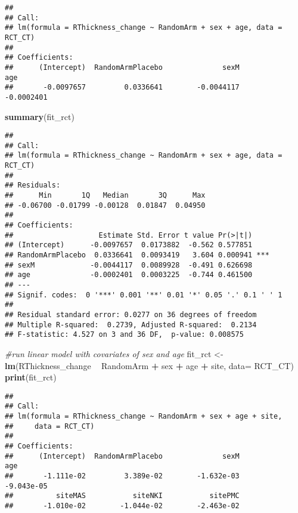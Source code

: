 \documentclass[]{article}
\newenvironment{Shaded}{\begin{snugshade}}{\end{snugshade}}
\newcommand{\KeywordTok}[1]{\textcolor[rgb]{0.13,0.29,0.53}{\textbf{#1}}}
\newcommand{\DataTypeTok}[1]{\textcolor[rgb]{0.13,0.29,0.53}{#1}}
\newcommand{\StringTok}[1]{\textcolor[rgb]{0.31,0.60,0.02}{#1}}
\newcommand{\CommentTok}[1]{\textcolor[rgb]{0.56,0.35,0.01}{\textit{#1}}}
\newcommand{\OperatorTok}[1]{\textcolor[rgb]{0.81,0.36,0.00}{\textbf{#1}}}
\newcommand{\NormalTok}[1]{#1}
\theoremstyle{definition}
\theoremstyle{definition}
\theoremstyle{definition}
\theoremstyle{remark}
\begin{document}
\begin{verbatim}
## 
## Call:
## lm(formula = RThickness_change ~ RandomArm + sex + age, data = RCT_CT)
## 
## Coefficients:
##      (Intercept)  RandomArmPlacebo              sexM               age  
##       -0.0097657         0.0336641        -0.0044117        -0.0002401
\end{verbatim}

\begin{Shaded}
\begin{Highlighting}[]
  \KeywordTok{summary}\NormalTok{(fit_rct)}
\end{Highlighting}
\end{Shaded}

\begin{verbatim}
## 
## Call:
## lm(formula = RThickness_change ~ RandomArm + sex + age, data = RCT_CT)
## 
## Residuals:
##      Min       1Q   Median       3Q      Max 
## -0.06700 -0.01799 -0.00128  0.01847  0.04950 
## 
## Coefficients:
##                    Estimate Std. Error t value Pr(>|t|)    
## (Intercept)      -0.0097657  0.0173882  -0.562 0.577851    
## RandomArmPlacebo  0.0336641  0.0093419   3.604 0.000941 ***
## sexM             -0.0044117  0.0089928  -0.491 0.626698    
## age              -0.0002401  0.0003225  -0.744 0.461500    
## ---
## Signif. codes:  0 '***' 0.001 '**' 0.01 '*' 0.05 '.' 0.1 ' ' 1
## 
## Residual standard error: 0.0277 on 36 degrees of freedom
## Multiple R-squared:  0.2739, Adjusted R-squared:  0.2134 
## F-statistic: 4.527 on 3 and 36 DF,  p-value: 0.008575
\end{verbatim}

\begin{Shaded}
\begin{Highlighting}[]
\CommentTok{#run linear model with covariates of sex and age}
\NormalTok{  fit_rct <-}\StringTok{ }\KeywordTok{lm}\NormalTok{(RThickness_change }\OperatorTok{~}\StringTok{ }\NormalTok{RandomArm }\OperatorTok{+}\StringTok{ }\NormalTok{sex }\OperatorTok{+}\StringTok{ }\NormalTok{age }\OperatorTok{+}\StringTok{ }\NormalTok{site, }\DataTypeTok{data=}\NormalTok{ RCT_CT)}
  \KeywordTok{print}\NormalTok{(fit_rct)}
\end{Highlighting}
\end{Shaded}

\begin{verbatim}
## 
## Call:
## lm(formula = RThickness_change ~ RandomArm + sex + age + site, 
##     data = RCT_CT)
## 
## Coefficients:
##      (Intercept)  RandomArmPlacebo              sexM               age  
##       -1.111e-02         3.389e-02        -1.632e-03        -9.043e-05  
##          siteMAS           siteNKI           sitePMC  
##       -1.010e-02        -1.044e-02        -2.463e-02
\end{verbatim}
\end{document}
